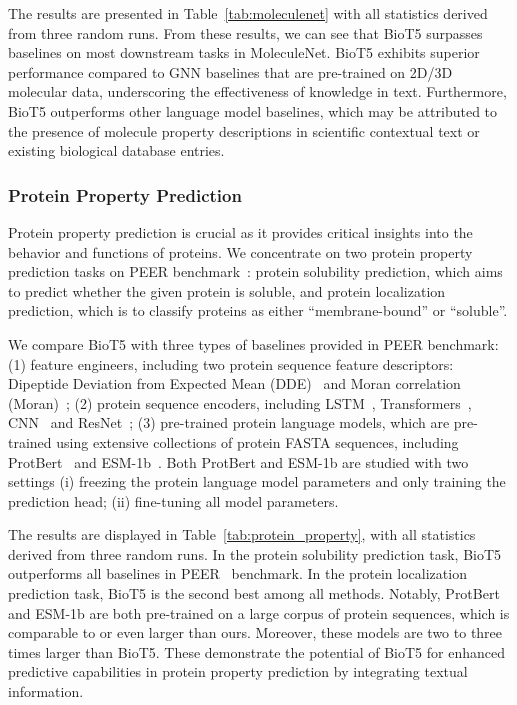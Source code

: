 \documentclass[11pt]{article}
\newcommand{\method}{{BioT5}}
\begin{document}
The results are presented in Table~\ref{tab:moleculenet} with all statistics derived from three random runs.
From these results, we can see that \method{} surpasses baselines on most downstream tasks in MoleculeNet.
\method{} exhibits superior performance compared to GNN baselines that are pre-trained on 2D/3D molecular data, underscoring the effectiveness of knowledge in text.
Furthermore, \method{} outperforms other language model baselines, which may be attributed to the presence of molecule property descriptions in scientific contextual text or existing biological database entries.

\subsubsection{Protein Property Prediction}
\label{sec:protein_property_prediction}
Protein property prediction is crucial as it provides critical insights into the behavior and functions of proteins.
We concentrate on two protein property prediction tasks on PEER benchmark~\citep{xu2022peer}: protein solubility prediction, which aims to predict whether the given protein is soluble, and protein localization prediction, which is to classify proteins as either ``membrane-bound'' or ``soluble''.


We compare \method{} with three types of baselines provided in PEER benchmark:
(1) feature engineers, including two protein sequence feature descriptors: Dipeptide Deviation from Expected Mean (DDE)~\citep{saravanan2015harnessing} and Moran correlation (Moran)~\citep{feng2000prediction};
(2) protein sequence encoders, including LSTM~\citep{hochreiter1997long}, Transformers~\citep{vaswani2017attention}, CNN~\citep{o2015introduction} and ResNet~\citep{he2016deep};
(3) pre-trained protein language models, which are pre-trained using extensive collections of protein FASTA sequences, including ProtBert~\citep{elnaggar2021prottrans} and ESM-1b~\citep{rives2021biological}.
Both ProtBert and ESM-1b are studied with two settings 
(i) freezing the protein language model parameters and only training the prediction head;
(ii) fine-tuning all model parameters.

The results are displayed in Table~\ref{tab:protein_property}, with all statistics derived from three random runs.
In the protein solubility prediction task, \method{} outperforms all baselines in PEER~\citep{xu2022peer} benchmark.
In the protein localization prediction task, \method{} is the second best among all methods.
Notably, ProtBert and ESM-1b are both pre-trained on a large corpus of protein sequences, which is comparable to or even larger than ours.
Moreover, these models are two to three times larger than \method{}.
These demonstrate the potential of \method{} for enhanced predictive capabilities in protein property prediction by integrating textual information.
\end{document}
